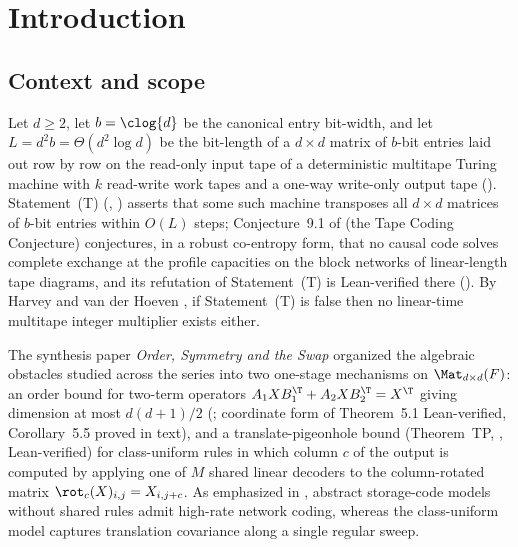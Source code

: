 \section{Introduction}\label{sec:intro}

\subsection{Context and scope}\label{sec:context}

Let $d \ge 2$, let $b = \clog{d}$ be the canonical entry bit-width, and let
$L = d^2 b = \Theta(d^2\log d)$ be the bit-length of a $d \times d$ matrix of $b$-bit entries laid
out row by row on the read-only input tape of a deterministic multitape Turing machine with $k$
read-write work tapes and a one-way write-only output tape
(\cite[Sections~2.1--2.2 and Definition~2.1]{FirstPaper2026}).
Statement~(T) (\cite[Definition~2.1]{FirstPaper2026}, )
asserts that some such machine transposes all $d \times d$ matrices of $b$-bit entries within
$O(L)$ steps; Conjecture~9.1 of \cite{FirstPaper2026} (the Tape Coding Conjecture) conjectures, in a
robust co-entropy form, that no causal code solves complete exchange at the profile capacities on the
block networks of linear-length tape diagrams, and its refutation of Statement~(T) is Lean-verified
there (\cite[Theorem~9.2]{FirstPaper2026}). By Harvey and
van der Hoeven \cite[Corollary~6.9]{HvdH2025}, if Statement~(T) is false then no linear-time
multitape integer multiplier exists either.

The synthesis paper \emph{Order, Symmetry and the Swap} \cite{SeventeenthPaper2026} organized the
algebraic obstacles studied across the series into two one-stage mechanisms on $\Mat_{d\times d}(F)$:
an order bound for two-term operators $A_1 X B_1^{\T} + A_2 X B_2^{\T} = X^{\T}$ giving dimension at
most $d(d+1)/2$ (\cite[Theorem~5.1 and Corollary~5.5]{SeventeenthPaper2026}; coordinate form of
Theorem~5.1 Lean-verified, Corollary~5.5 proved in text),
and a translate-pigeonhole bound (Theorem~TP, \cite[Definition~6.3 and Theorem~6.4]{SeventeenthPaper2026},
Lean-verified)
for class-uniform rules in which column $c$ of the output is computed by applying one of $M$ shared
linear decoders to the column-rotated matrix $\rot_c(X)_{i,j} = X_{i, j+c}$. As emphasized in
\cite[Sections~4.2 and~4.6]{SeventeenthPaper2026}, abstract storage-code models without shared rules
admit high-rate network coding, whereas the class-uniform model captures translation covariance along
a single regular sweep.


